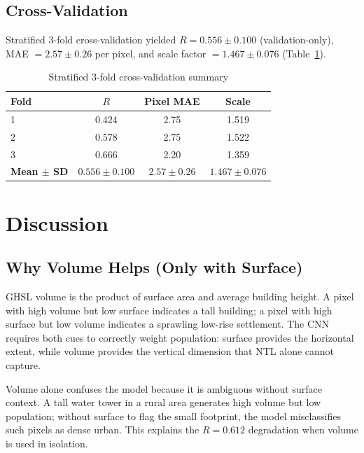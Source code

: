 \documentclass[conference]{IEEEtran}
\begin{document}
\subsection{Cross-Validation}
\label{subsec:cv_results}

Stratified 3-fold cross-validation yielded $R = 0.556 \pm 0.100$ (validation-only), MAE $= 2.57 \pm 0.26$ per pixel, and scale factor $= 1.467 \pm 0.076$ (Table~\ref{tab:cv}).

\begin{table}[htbp]
\caption{Stratified 3-fold cross-validation summary}
\label{tab:cv}
\centering
\begin{tabular}{@{}lccc@{}}
\toprule
\textbf{Fold} & \textbf{$R$} & \textbf{Pixel MAE} & \textbf{Scale} \\
\midrule
1 & 0.424 & 2.75 & 1.519 \\
2 & 0.578 & 2.75 & 1.522 \\
3 & 0.666 & 2.20 & 1.359 \\
\textbf{Mean $\pm$ SD} & $\mathbf{0.556 \pm 0.100}$ & $\mathbf{2.57 \pm 0.26}$ & $\mathbf{1.467 \pm 0.076}$ \\
\bottomrule
\end{tabular}
\end{table}

\section{Discussion}
\label{sec:discussion}

\subsection{Why Volume Helps (Only with Surface)}
\label{subsec:why_volume}

GHSL volume is the product of surface area and average building height. A pixel with high volume but low surface indicates a tall building; a pixel with high surface but low volume indicates a sprawling low-rise settlement. The CNN requires both cues to correctly weight population: surface provides the horizontal extent, while volume provides the vertical dimension that NTL alone cannot capture.

Volume alone confuses the model because it is ambiguous without surface context. A tall water tower in a rural area generates high volume but low population; without surface to flag the small footprint, the model misclassifies such pixels as dense urban. This explains the $R = 0.612$ degradation when volume is used in isolation.
\end{document}
